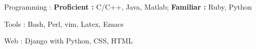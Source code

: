 


\begin{cvskills}


\cvskill
{Programming : } %
{\textbf{Proficient :}  C/C++, Java, Matlab; 
  \textbf{Familiar :} Ruby, Python} %

\cvskill
{Tools : }
{Bash, Perl, vim, Latex, Emacs}


\cvskill
{Web : } %
{Django with Python, CSS, HTML}

\end{cvskills}
